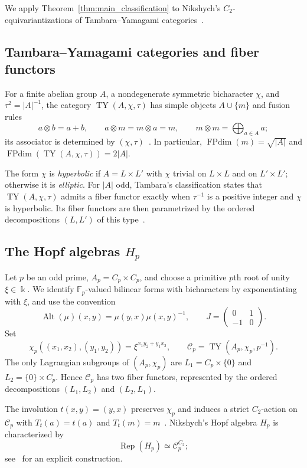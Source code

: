 \documentclass[12pt]{amsart}
\theoremstyle{plain}
\theoremstyle{definition} %
\theoremstyle{remark} %
\newcommand{\ku}{{\Bbbk}} %
\newcommand{\cC}{\mathcal{C}}
\newcommand{\TY}{\operatorname{TY}}
\newcommand{\FPdim}{\operatorname{FPdim}}
\newcommand{\Rep}{\operatorname{Rep}}
\newcommand{\Alt}{\operatorname{Alt}}
\begin{document}
We apply Theorem~\ref{thm:main_classification} to Nikshych's $C_2$-equivariantizations of Tambara--Yamagami categories~\cite{Nik08}.

\subsection{Tambara--Yamagami categories and fiber functors}

For a finite abelian group $A$, a nondegenerate symmetric bicharacter $\chi$, and $\tau^2=|A|^{-1}$, the category $\TY(A,\chi,\tau)$ has simple objects $A\cup\{m\}$ and fusion rules
\[
a\otimes b=a+b,
\qquad
a\otimes m=m\otimes a=m,
\qquad
m\otimes m=\bigoplus_{a\in A}a;
\]
its associator is determined by $(\chi,\tau)$~\cite{TY98}. In particular, $\FPdim(m)=\sqrt{|A|}$ and $\FPdim(\TY(A,\chi,\tau))=2|A|$.

The form $\chi$ is \emph{hyperbolic} if $A=L\times L'$ with $\chi$ trivial on $L\times L$ and on $L'\times L'$; otherwise it is \emph{elliptic}. For $|A|$ odd, Tambara's classification states that $\TY(A,\chi,\tau)$ admits a fiber functor exactly when $\tau^{-1}$ is a positive integer and $\chi$ is hyperbolic. Its fiber functors are then parametrized by the ordered decompositions $(L,L')$ of this type~\cite[Propositions~4.1 and~4.2]{T00}.

\subsection{The Hopf algebras \texorpdfstring{$H_p$}{Hp}}

Let $p$ be an odd prime, $A_p=C_p\times C_p$, and choose a primitive $p$th root of unity $\xi\in\ku$. We identify $\mathbb F_p$-valued bilinear forms with bicharacters by exponentiating with $\xi$, and use the convention
\[
\Alt(\mu)(x,y)=\mu(y,x)\mu(x,y)^{-1},
\qquad
J=\begin{pmatrix}0&1\\-1&0\end{pmatrix}.
\]
Set
\[
\chi_p((x_1,x_2),(y_1,y_2))=\xi^{x_1y_2+y_1x_2},
\qquad
\cC_p=\TY(A_p,\chi_p,p^{-1}).
\]
The only Lagrangian subgroups of $(A_p,\chi_p)$ are
$L_1=C_p\times\{0\}$ and $L_2=\{0\}\times C_p$. Hence $\cC_p$ has two fiber functors, represented by the ordered decompositions $(L_1,L_2)$ and $(L_2,L_1)$.

The involution $t(x,y)=(y,x)$ preserves $\chi_p$ and induces a strict $C_2$-action on $\cC_p$ with $T_t(a)=t(a)$ and $T_t(m)=m$~\cite[Proposition~2.10]{Nik08}. Nikshych's Hopf algebra $H_p$ is characterized by
\[
\Rep(H_p)\simeq\cC_p^{C_2};
\]
see~\cite[Theorem~1]{CM17} for an explicit construction.
\end{document}

